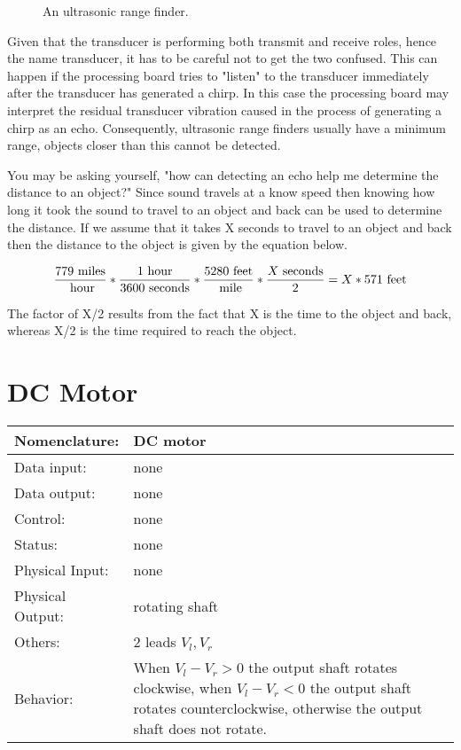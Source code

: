 \begin{figure}[ht]
\caption{An ultrasonic range finder.}
\label{fig:commonPeripheralComponentsultra}
\end{figure}

Given that the transducer is performing both transmit and receive
roles, hence the name transducer, it has to be careful not to get 
the two confused.  This can
happen if the processing board tries to "listen" to the transducer
immediately after the transducer has generated a chirp.  In this case
the processing board may interpret the residual transducer vibration
caused in the process of generating a chirp as an echo.  Consequently,
ultrasonic range finders 
usually have a minimum range, objects closer than this cannot be detected.

You may be asking yourself, "how can detecting an echo help me determine
the distance to an object?"  Since sound travels at a know speed
then knowing how long it took the sound to travel
to an object and back can be used to determine the distance.  If we assume
that it takes X seconds to travel to an object and back then the distance
to the object is given by the equation below.

$$	\frac{779 {\rm \ miles}}{{\rm \ hour}} * 
	\frac{1 {\rm \ hour}} {3600 {\rm \ seconds}} * 
	\frac{5280 {\rm \ feet}}{{\rm \ mile}} * 
	\frac{X {\rm \ seconds}}{2} =
	X * 571 {\rm \ feet} $$

The factor of X/2 results from the fact that X is the time to the 
object and back, whereas X/2 is the time required to reach the object. 




\section{DC Motor}
\label{page:dvmotor}
\begin{tabular}{|l|p{3.5in}|} \hline
Nomenclature:  & DC motor  \\ \hline
Data input:    & none    \\ \hline
Data output:   & none     \\ \hline
Control:       & none     \\ \hline
Status:        & none      \\ \hline
Physical Input:& none		\\ \hline
Physical Output:& rotating shaft		\\ \hline
Others:        & 2 leads $V_l, V_r$      \\ \hline
Behavior:      & When $V_l-V_r > 0$ the output shaft rotates clockwise, 
when $V_l-V_r < 0$ the output shaft rotates counterclockwise, otherwise the
output shaft does not rotate. \\ \hline
\end{tabular}

